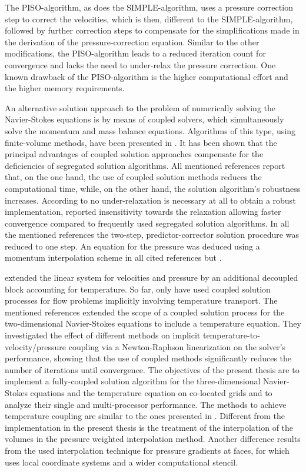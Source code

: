 The PISO-algorithm, as does the SIMPLE-algorithm, uses a pressure correction step to correct the velocities, which is then, different to the SIMPLE-algorithm, followed by further correction steps to compensate for the simplifications made in the derivation of the pressure-correction equation. Similar to the other modifications, the PISO-algorithm leads to a reduced iteration count for convergence and lacks the need to under-relax the pressure correction. One known drawback of the PISO-algorithm is the higher computational effort and the higher memory requirements.

An alternative solution approach to the problem of numerically solving the Navier-Stokes equations is by means of coupled solvers, which simultaneously solve the momentum and mass balance equations. Algorithms of this type, using finite-volume methods, have been presented in \cite{chen10,darwish09,falk13,galpin86,klaij13,mangani14,vakilipour12}. It has been shown \cite{darwish09} that the principal advantages of coupled solution approaches compensate for the deficiencies of segregated solution algorithms. All mentioned references report that, on the one hand, the use of coupled solution methods reduces the computational time, while, on the other hand, the solution algorithm's robustness increases. According to \cite{darwish09} no under-relaxation is necessary at all to obtain a robust implementation, \cite{galpin86} reported insensitivity towards the relaxation allowing faster convergence compared to frequently used segregated solution algorithms. In all the mentioned references the two-step, predictor-corrector solution procedure was reduced to one step. An equation for the pressure was deduced using a momentum interpolation scheme \cite{rhie82} in all cited references but \cite{galpin86}.

\cite{chen10} extended the linear system for velocities and pressure by an additional decoupled block accounting for temperature. So far, only \cite{galpin86,vakilipour12} have used coupled solution processes for flow problems implicitly involving temperature transport. The mentioned references extended the scope of a coupled solution process for the two-dimensional Navier-Stokes equations to include a temperature equation. They investigated the effect of different methods on implicit temperature-to-velocity/pressure coupling via a Newton-Raphson linearization on the solver's performance, showing that the use of coupled methods significantly reduces the number of iterations until convergence. The objectives of the present thesis are to implement a fully-coupled solution algorithm for the three-dimensional Navier-Stokes equations and the temperature equation on co-located grids and to analyze their single and multi-processor performance. The methods to achieve temperature coupling are similar to the ones presented in \cite{vakilipour12}. Different from the implementation in the present thesis is the treatment of the interpolation of the volumes in the pressure weighted interpolation method. Another difference results from the used interpolation technique for pressure gradients at faces, for which \cite{vakilipour12} uses local coordinate systems and a wider computational stencil.

